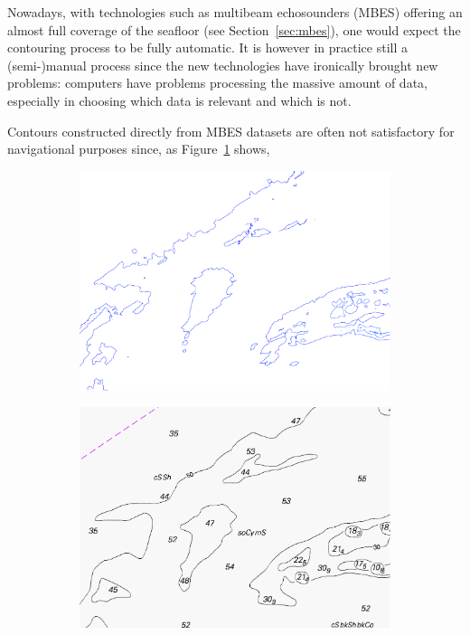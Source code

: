 %

Nowadays, with technologies such as multibeam echosounders (MBES) offering an almost full coverage of the seafloor (see Section~\ref{sec:mbes}), one would expect the contouring process to be fully automatic.
It is however in practice still a (semi-)manual process since the new technologies have ironically brought new problems: computers have problems processing the massive amount of data, especially in choosing which data is relevant and which is not.

%

Contours constructed directly from MBES datasets are often not satisfactory for navigational purposes since, as Figure~\ref{fig:raw} shows,
\begin{figure}
  \centering
  \begin{subfigure}[b]{0.45\linewidth}
    \centering
    \includegraphics[width=\textwidth]{figs/raw.pdf}
    \caption{}\label{fig:raw}
  \end{subfigure}%
  \begin{subfigure}[b]{0.45\linewidth}
    \centering
    \includegraphics[width=\textwidth]{figs/maponly.pdf}

\end{subfigure}
\end{figure}

